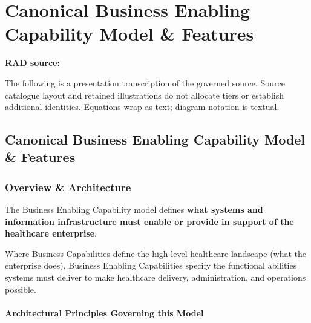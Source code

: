 \chapter{Canonical Business Enabling Capability Model \& Features}\label{rad:enabling}
\noindent\textbf{RAD source:} \texttt{}

The following is a presentation transcription of the governed source. Source catalogue layout and retained illustrations do not allocate tiers or establish additional identities. Equations wrap as text; diagram notation is textual.

\label{rad:enabling:1}
\section*{Canonical Business Enabling Capability Model \& Features}
\label{rad:enabling:3}
\subsection*{Overview \& Architecture}
\label{rad:enabling:5}

The Business Enabling Capability model defines \textbf{what systems and information infrastructure must enable or provide in support of the healthcare enterprise}.

\label{rad:enabling:7}

Where Business Capabilities define the high-level healthcare landscape (what the enterprise does), Business Enabling Capabilities specify the functional abilities systems must deliver to make healthcare delivery, administration, and operations possible.

\label{rad:enabling:9}
\subsubsection*{Architectural Principles Governing this Model}
\label{rad:enabling:10}

